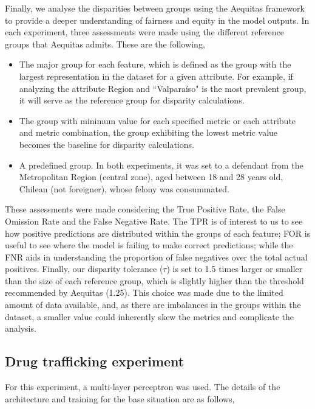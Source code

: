 \documentclass[fleqn,10pt]{wlscirep}
\begin{document}
Finally, we analyse the disparities between groups using the Aequitas framework to provide a deeper understanding of fairness and equity in the model outputs.  In each experiment, three assessments were made using the different reference groups that Aequitas admits. These are the following, 

\begin{itemize}
    \item The major group for each feature, which is defined as the group with the largest representation in the dataset for a given attribute. For example, if analyzing the attribute Region and ``Valparaíso" is the most prevalent group, it will serve as the reference group for disparity calculations.  
    \item The group with minimum value for each specified metric or each attribute and metric combination, the group exhibiting the lowest metric value becomes the baseline for disparity calculations. 
    \item A predefined group. In both experiments, it was set to a defendant from the Metropolitan Region (central zone), aged between 18 and 28 years old, Chilean (not foreigner), whose felony was consummated. 
\end{itemize}


These assessments were made considering the True Positive Rate, the False Omission Rate and the False Negative Rate. The TPR is of interest to us to see how positive predictions are distributed within the groups of each feature; FOR is useful to see where the model is failing to make correct predictions; while the FNR aids in understanding the proportion of false negatives over the total actual positives. Finally, our disparity tolerance ($\tau$) is set to 1.5 times larger or smaller than the size of each reference group, which is slightly higher than the threshold recommended by Aequitas (1.25). This choice was made due to the limited amount of data available, and, as there are imbalances in the groups within the dataset, a smaller value could inherently skew the metrics and complicate the analysis.


\subsection{Drug trafficking experiment}

For this experiment, a multi-layer perceptron was used. The details of the architecture and training for the base situation are as follows,
\end{document}
